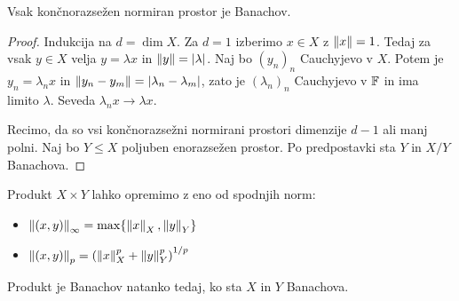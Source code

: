 
\begin{posledica}
  Vsak končnorazsežen normiran prostor je Banachov.
\end{posledica}

\begin{proof}
  Indukcija na $d = \dim X$.
  Za $d = 1$ izberimo $x \in X$ z $\left\lVert x\right\rVert = 1$.
  Tedaj za vsak $y \in X$ velja $y = \lambda x$ in $\left\lVert y\right\rVert = \left| \lambda \right|$.
  Naj bo $(y_n)_n$ Cauchyjevo v $X$.
  Potem je $y_n = \lambda_n x$ in $\left\lVert y_n - y_m\right\rVert = \left| \lambda_n -
	\lambda_m \right|$,
  zato je $(\lambda_n)_n$ Cauchyjevo v $\mathbb{F}$ in ima limito $\lambda$.
  Seveda $\lambda_n x \to \lambda x$.

  Recimo, da so vsi končnorazsežni normirani prostori dimenzije $d-1$ ali manj
  polni.
  Naj bo $Y \le X$ poljuben enorazsežen prostor.
  Po predpostavki sta $Y$ in $X/Y$ Banachova.
\end{proof}


Produkt $X \times Y$ lahko opremimo z eno od spodnjih norm:
\begin{itemize}
\item $\left\lVert(x,y)\right\rVert_\infty = \max \{ \left\lVert x\right\rVert_X, \left\lVert y\right\rVert_Y \}$
\item $\left\lVert(x,y)\right\rVert_p = \left( \left\lVert x\right\rVert_X^p + \left\lVert y\right\rVert_Y^p \right)^{1/p}$
\end{itemize}
Produkt je Banachov natanko tedaj, ko sta $X$ in $Y$ Banachova.


